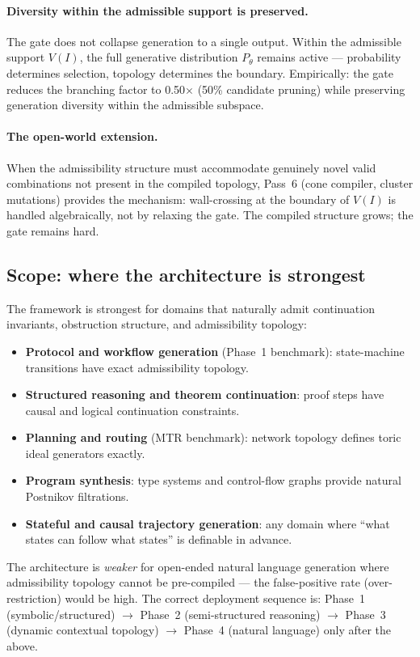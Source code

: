 \documentclass[11pt,a4paper]{article}
\begin{document}
\paragraph{Diversity within the admissible support is preserved.}
The gate does not collapse generation to a single output.
Within the admissible support $V(I)$, the full generative distribution
$P_\theta$ remains active --- probability determines selection,
topology determines the boundary.
Empirically: the gate reduces the branching factor to 0.50$\times$
(50\% candidate pruning) while preserving generation diversity within
the admissible subspace.

\paragraph{The open-world extension.}
When the admissibility structure must accommodate genuinely novel
valid combinations not present in the compiled topology, Pass~6
(cone compiler, cluster mutations) provides the mechanism:
wall-crossing at the boundary of $V(I)$ is handled algebraically,
not by relaxing the gate.
The compiled structure grows; the gate remains hard.

\subsection{Scope: where the architecture is strongest}

The framework is strongest for domains that naturally admit
continuation invariants, obstruction structure, and admissibility
topology:
\begin{itemize}
  \item \textbf{Protocol and workflow generation} (Phase~1 benchmark):
        state-machine transitions have exact admissibility topology.
  \item \textbf{Structured reasoning and theorem continuation}:
        proof steps have causal and logical continuation constraints.
  \item \textbf{Planning and routing} (MTR benchmark):
        network topology defines toric ideal generators exactly.
  \item \textbf{Program synthesis}: type systems and control-flow
        graphs provide natural Postnikov filtrations.
  \item \textbf{Stateful and causal trajectory generation}:
        any domain where ``what states can follow what states'' is
        definable in advance.
\end{itemize}
The architecture is \emph{weaker} for open-ended natural language
generation where admissibility topology cannot be pre-compiled ---
the false-positive rate (over-restriction) would be high.
The correct deployment sequence is:
Phase~1 (symbolic/structured) $\to$
Phase~2 (semi-structured reasoning) $\to$
Phase~3 (dynamic contextual topology) $\to$
Phase~4 (natural language) only after the above.
\end{document}
